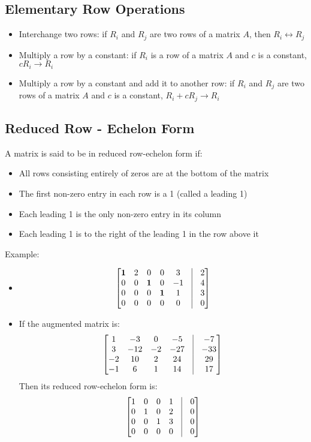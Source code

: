 \documentclass{article}
\begin{document}
\subsection*{Elementary Row Operations}
\begin{itemize}
    \item Interchange two rows: if $R_i$ and $R_j$ are two rows of a matrix $A$, then $R_i \leftrightarrow R_j$ 
    \item Multiply a row by a constant: if $R_i$ is a row of a matrix $A$ and $c$ is a constant, $cR_i \rightarrow R_i$
    \item Multiply a row by a constant and add it to another row: if $R_i$ and $R_j$ are two rows of a matrix $A$ and $c$ is a constant, $R_i + cR_j \rightarrow R_i$
\end{itemize}

\subsection*{Reduced Row - Echelon Form}
A matrix is said to be in reduced row-echelon form if:
\begin{itemize}
    \item All rows consisting entirely of zeros are at the bottom of the matrix
    \item The first non-zero entry in each row is a 1 (called a leading 1)
    \item Each leading 1 is the only non-zero entry in its column
    \item Each leading 1 is to the right of the leading 1 in the row above it
\end{itemize}
Example:
\begin{itemize}
    \item $$\begin{bmatrix}
    \textbf{1} & 2 & 0 & 0 & 3 & \vline & 2 \\
    0 & 0 & \textbf{1} & 0 & -1 & \vline & 4\\
    0 & 0 & 0 & \textbf{1} & 1 & \vline & 3 \\
    0 & 0 & 0 & 0 & 0 & \vline & 0
    \end{bmatrix}$$
    \item If the augmented matrix is: 
    $$\begin{bmatrix}
        1 & -3 & 0 & -5 & \vline & -7 \\
        3 & -12 & -2 & -27 & \vline & -33 \\
        -2 & 10 & 2 & 24 & \vline & 29 \\
        -1 & 6 & 1 & 14 & \vline & 17 \\
    \end{bmatrix}$$
    Then its reduced row-echelon form is:
    $$\begin{bmatrix}
        1 & 0 & 0 & 1 & \vline & 0 \\
        0 & 1 & 0 & 2 & \vline & 0 \\
        0 & 0 & 1 & 3 & \vline & 0 \\
        0 & 0 & 0 & 0 & \vline & 0 \\
    \end{bmatrix}$$
\end{itemize}
\end{document}
